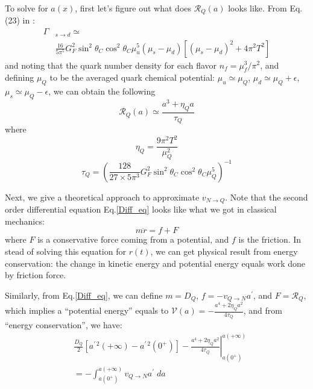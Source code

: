 \documentclass[superscriptaddress,amsmath,floatfix,aps,prc,twocolumn]{revtex4-1}
\begin{document}
To solve for $a(x)$, first let's figure out what does $\mathcal{R}_Q(a)$ looks like. From Eq.(23) in \cite{Madsen:1993xx}:
\begin{equation}
\begin{aligned}
	\Gamma&_{s\to d} \simeq  \\
    & \frac{16}{5\pi^5}G_F^2\sin^2\theta_C \cos^2\theta_C \mu_u^5(\mu_s - \mu_d)\left[ (\mu_s - \mu_d)^2 + 4\pi^2 T^2 \right]
\end{aligned}
\end{equation}
and noting that the quark number density for each flavor $n_f = \mu_f^3/\pi^2$, and defining $\mu_Q$ to be the averaged quark chemical potential: $\mu_u\simeq \mu_Q$, $\mu_d\simeq \mu_Q+\epsilon$, $\mu_s \simeq \mu_Q - \epsilon$, we can obtain the following
\begin{equation}
	\mathcal{R}_Q(a) \simeq \frac{a^3 + \eta_Qa}{\tau_Q}
    \label{eq:Rq}
\end{equation}
where
\begin{equation}
\eta_Q = \frac{9\pi^2 T^2}{\mu_Q^2}
\end{equation}
\begin{equation}
\tau_Q = \left( \frac{128}{27\times 5\pi^3} G_F^2\sin^2\theta_C \cos^2\theta_C \mu_Q^5 \right)^{-1}
\end{equation}

Next, we give a theoretical approach to approximate $v_{N\to Q}$. Note that the second order differential equation Eq.\eqref{Diff_eq} looks like what we got in classical mechanics:
\begin{equation}
m\ddot{r} = f + F
\end{equation}
where $F$ is a conservative force coming from a potential, and $f$ is the friction. In stead of solving this equation for $r(t)$, we can get physical result from energy conservation: the change in kinetic energy and potential energy equals work done by friction force. 

Similarly, from Eq.\eqref{Diff_eq}, we can define $m = D_Q$, $f = -v_{Q\to N}a^\prime$, and $F = \mathcal{R}_Q$, which implies a ``potential energy'' equals to $\mathcal{V}(a) = -\frac{a^4 + 2\eta_Q a^2}{4\tau_Q}$, and from ``energy conservation'', we have:
\begin{equation}
\begin{aligned}
& \frac{D_Q}{2}\left[ a^{\prime\,2}(+\infty) - a^{\prime\,2}(0^+) \right] - \left.\frac{a^4 + 2\eta_Q a^2}{4\tau_Q}\right|_{a(0^+)}^{a(+\infty)} \\
& = -\int_{a(0^+)}^{a(+\infty)} v_{Q\to N}a^\prime\;da \label{Eq14}
\end{aligned}
\end{equation}
\end{document}
